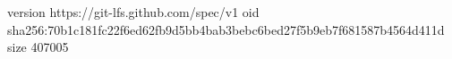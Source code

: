 version https://git-lfs.github.com/spec/v1
oid sha256:70b1c181fc22f6ed62fb9d5bb4bab3bebc6bed27f5b9eb7f681587b4564d411d
size 407005
